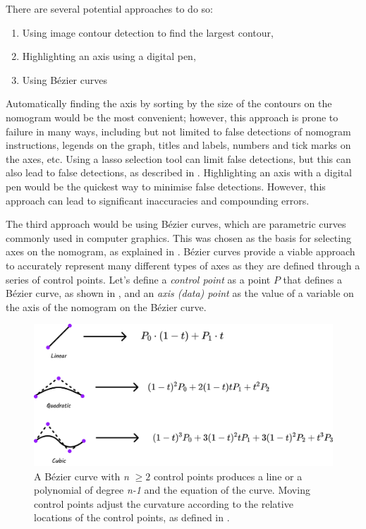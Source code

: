 \documentclass{l4proj}
\begin{document}
There are several potential approaches to do so: 
\begin{enumerate}
    \item Using image contour detection to find the largest contour, 
    \item Highlighting an axis using a digital pen,
    \item Using Bézier curves
\end{enumerate}

Automatically finding the axis by sorting by the size of the contours on the nomogram would be the most convenient; however, this approach is prone to failure in many ways, including but not limited to false detections of nomogram instructions, legends on the graph, titles and labels, numbers and tick marks on the axes, etc. Using a lasso selection tool can limit false detections, but this can also lead to false detections, as described in . 
Highlighting an axis with a digital pen would be the quickest way to minimise false detections. However, this approach can lead to significant inaccuracies and compounding errors.    

The third approach would be using Bézier curves, which are  
parametric curves commonly used in computer graphics. This was chosen as the basis for selecting axes on the nomogram, as explained in . Bézier curves provide a viable approach to accurately represent many different types of axes as they are defined through a series of control points. Let's define a  \textit{control point} as a point \(P\) that defines a Bézier curve, as shown in , and an \textit{axis (data) point} as the value of a variable on the axis of the nomogram on the Bézier curve. 

\begin{figure}[H]
    \centering
    \includegraphics[width=0.875\linewidth]{dissertation//images//myFigures//design/bezier_control_points.png}
    \caption{A Bézier curve with \textit{n} \(\geq2\) control points produces a line or a polynomial of degree \textit{n-1} and the equation of the curve. Moving control points adjust the curvature according to the relative locations of the control points, as defined in . 
    \citep{melo_understanding_2021}}
    \label{fig:bezier-diagram}
\end{figure} 
\end{document}
